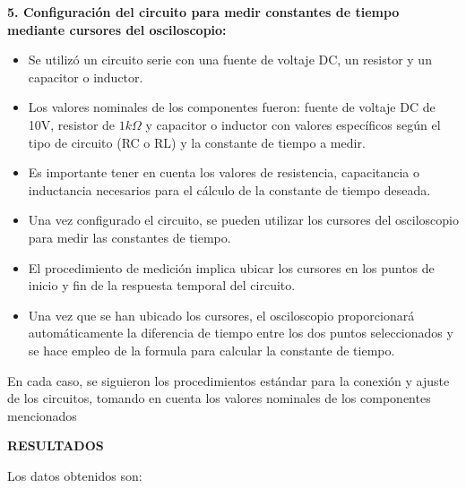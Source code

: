\documentclass[12pt]{article}
\begin{document}
	\textbf{5. Configuración del circuito para medir constantes de tiempo mediante cursores del osciloscopio:}
	
	\begin{itemize}
		\item Se utilizó un circuito serie con una fuente de voltaje DC, un resistor y un capacitor o inductor.
		\item Los valores nominales de los componentes fueron: fuente de voltaje DC de 10V, resistor de $1k\Omega$ y capacitor o inductor con valores específicos según el tipo de circuito (RC o RL) y la constante de tiempo a medir.
		\item Es importante tener en cuenta los valores de resistencia, capacitancia o inductancia necesarios para el cálculo de la constante de tiempo deseada.
		\item Una vez configurado el circuito, se pueden utilizar los cursores del osciloscopio para medir las constantes de tiempo.
		\item El procedimiento de medición implica ubicar los cursores en los puntos de inicio y fin de la respuesta temporal del circuito.	
		\item Una vez que se han ubicado los cursores, el osciloscopio proporcionará automáticamente la diferencia de tiempo entre los dos puntos seleccionados y se hace empleo de la formula para calcular la constante de tiempo.	
		
	\end{itemize}
	
	En cada caso, se siguieron los procedimientos estándar para la conexión y ajuste de los circuitos, tomando en cuenta los valores nominales de los componentes mencionados
	
	\newpage
	
	\begin{center}
		\textbf{\large RESULTADOS}\\
	\end{center}
	
	\noindent Los datos obtenidos son:
	
\end{document}
